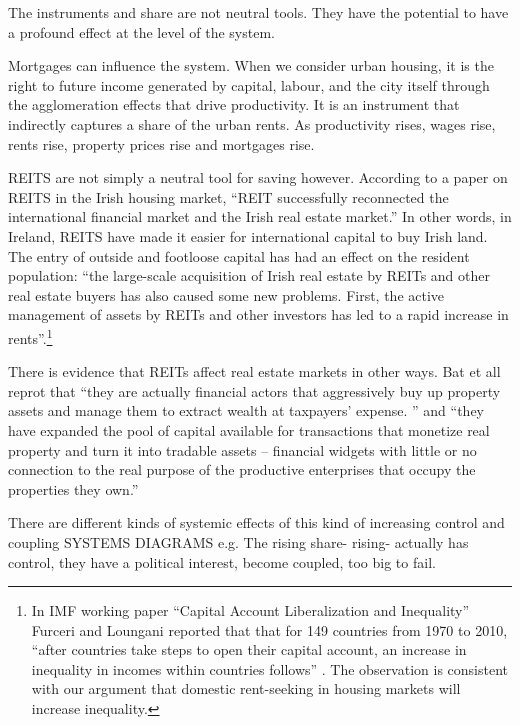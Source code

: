 
The instruments and share are not neutral tools. They have the potential to have a profound effect at the level of the system.

Mortgages can influence the system. 
When we consider urban housing, it is the right to future income generated by capital, labour, and the city itself through the agglomeration effects that drive productivity. It is an instrument that indirectly captures a share of the urban rents. As productivity rises, wages rise, rents rise, property prices rise and mortgages rise. 

REITS  are not simply a neutral tool for saving however. According to a paper \cite{wangAnalyzeImpactREITs2021} on REITS in the Irish housing market, ``REIT successfully reconnected the international financial market and the Irish real estate market.'' In other words, in Ireland, REITS have made it easier for international capital to buy Irish land. The entry of outside and footloose capital has had an effect on the resident population:  ``the large-scale acquisition of Irish real estate by REITs and other real estate buyers has also caused some new problems. First, the active management of assets by REITs and other investors has led to a rapid increase in rents''.\footnote{In  IMF working paper ``Capital Account Liberalization and Inequality'' \cite{furceriCapitalAccountLiberalization2015}  Furceri and Loungani reported that that for 149 countries from 1970 to 2010, ``after countries take steps to open their capital account, an increase in inequality in incomes within countries follows'' . The observation is consistent with our argument  that domestic rent-seeking in housing markets will increase inequality.}   

There is evidence that REITs affect real estate markets in other ways. Bat et all  \cite{batRolePublicREITs2022} reprot that  ``they are actually financial actors that aggressively buy up property assets and manage them to extract wealth at taxpayers’ expense. '' and ``they have expanded the pool of capital available for transactions that monetize real property and turn it into tradable assets – financial widgets with little or no connection to the real purpose of the productive enterprises that occupy the properties they own.''




There are different kinds of systemic effects of this kind of increasing control and coupling 
SYSTEMS DIAGRAMS
e.g.
The rising share- 
rising- actually has control, they have a political interest, become coupled, too big to fail.








